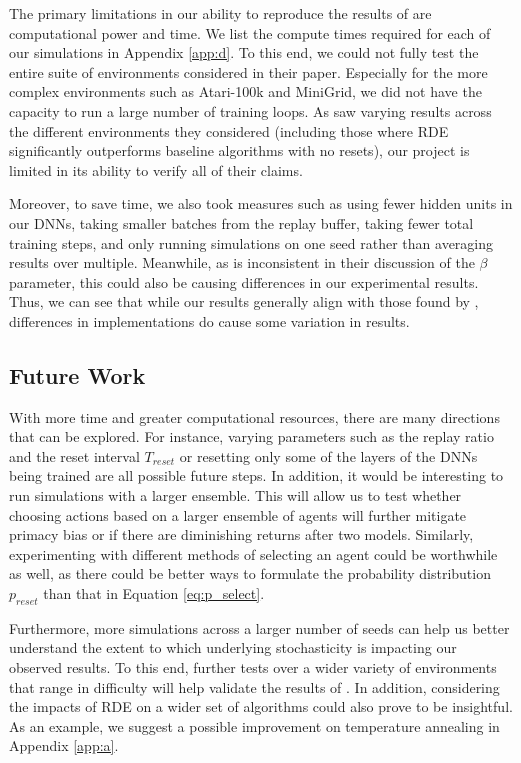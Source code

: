 \documentclass[base]{subfiles}
\begin{document}
The primary limitations in our ability to reproduce the results of \cite{kim2023} are computational power and time.
We list the compute times required for each of our simulations in Appendix \ref{app:d}.
To this end, we could not fully test the entire suite of environments considered in their paper.
Especially for the more complex environments such as Atari-100k and MiniGrid, we did not have the capacity to run a large number of training loops.
As \cite{kim2023} saw varying results across the different environments they considered (including those where RDE significantly outperforms baseline algorithms with no resets), our project is limited in its ability to verify all of their claims.

Moreover, to save time, we also took measures such as using fewer hidden units in our DNNs, taking smaller batches from the replay buffer, taking fewer total training steps, and only running simulations on one seed rather than averaging results over multiple.
Meanwhile, as \cite{kim2023} is inconsistent in their discussion of the $\beta$ parameter, this could also be causing differences in our experimental results.
Thus, we can see that while our results generally align with those found by \cite{kim2023}, differences in implementations do cause some variation in results.

\subsection{Future Work}
\label{ssec:future}

With more time and greater computational resources, there are many directions that can be explored.
For instance, varying parameters such as the replay ratio and the reset interval $T_{reset}$ or resetting only some of the layers of the DNNs being trained are all possible future steps.
In addition, it would be interesting to run simulations with a larger ensemble.
This will allow us to test whether choosing actions based on a larger ensemble of agents will further mitigate primacy bias or if there are diminishing returns after two models.
Similarly, experimenting with different methods of selecting an agent could be worthwhile as well, as there could be better ways to formulate the probability distribution $p_{reset}$ than that in Equation \ref{eq:p_select}.

Furthermore, more simulations across a larger number of seeds can help us better understand the extent to which underlying stochasticity is impacting our observed results.
To this end, further tests over a wider variety of environments that range in difficulty will help validate the results of \cite{kim2023}.
In addition, considering the impacts of RDE on a wider set of algorithms could also prove to be insightful.
As an example, we suggest a possible improvement on temperature annealing in Appendix \ref{app:a}.


\ifSubfilesClassLoaded{%
	\clearpage
	\printbibliography
}{}
\end{document}
